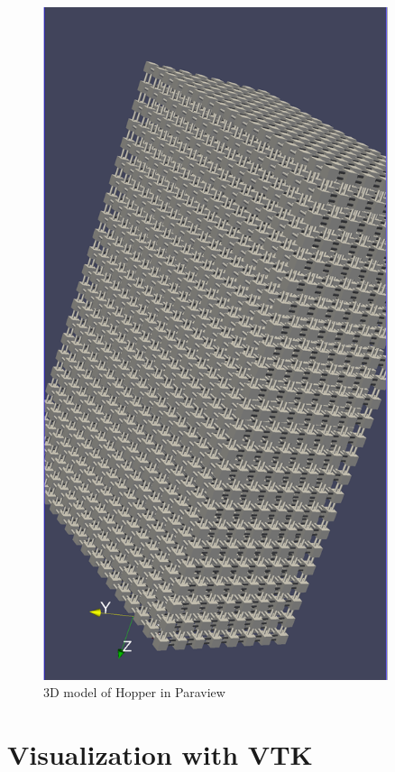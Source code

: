 

\begin{figure}[h!]
\centering
\includegraphics[angle=90, width=0.9\textwidth]{figures/vtk/hopper.png}
\caption{3D model of Hopper in Paraview}
\label{fig:vtk}
\end{figure}


\section{Visualization with VTK}
\label{sec:tutorials:vtk}

